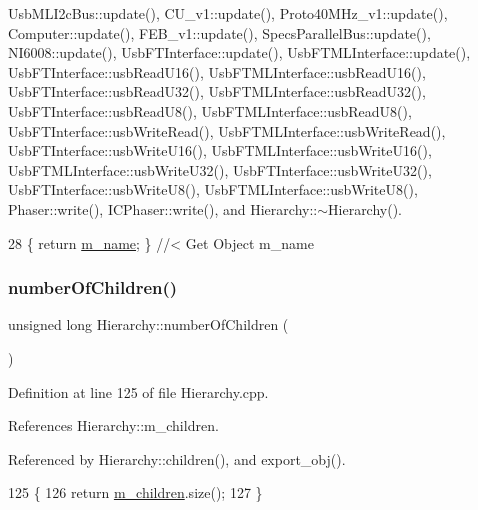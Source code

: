 Usb\+M\+L\+I2c\+Bus\+::update(), C\+U\+\_\+v1\+::update(), Proto40\+M\+Hz\+\_\+v1\+::update(), Computer\+::update(), F\+E\+B\+\_\+v1\+::update(), Specs\+Parallel\+Bus\+::update(), N\+I6008\+::update(), Usb\+F\+T\+Interface\+::update(), Usb\+F\+T\+M\+L\+Interface\+::update(), Usb\+F\+T\+Interface\+::usb\+Read\+U16(), Usb\+F\+T\+M\+L\+Interface\+::usb\+Read\+U16(), Usb\+F\+T\+Interface\+::usb\+Read\+U32(), Usb\+F\+T\+M\+L\+Interface\+::usb\+Read\+U32(), Usb\+F\+T\+Interface\+::usb\+Read\+U8(), Usb\+F\+T\+M\+L\+Interface\+::usb\+Read\+U8(), Usb\+F\+T\+Interface\+::usb\+Write\+Read(), Usb\+F\+T\+M\+L\+Interface\+::usb\+Write\+Read(), Usb\+F\+T\+Interface\+::usb\+Write\+U16(), Usb\+F\+T\+M\+L\+Interface\+::usb\+Write\+U16(), Usb\+F\+T\+M\+L\+Interface\+::usb\+Write\+U32(), Usb\+F\+T\+Interface\+::usb\+Write\+U32(), Usb\+F\+T\+Interface\+::usb\+Write\+U8(), Usb\+F\+T\+M\+L\+Interface\+::usb\+Write\+U8(), Phaser\+::write(), I\+C\+Phaser\+::write(), and Hierarchy\+::$\sim$\+Hierarchy().


\begin{DoxyCode}
28 \{ \textcolor{keywordflow}{return} \hyperlink{classObject_a8b83c95c705d2c3ba0d081fe1710f48d}{m\_name}; \} \textcolor{comment}{//< Get Object m\_name}
\end{DoxyCode}
\mbox{\label{classHierarchy_ab16e84de65fd84e14001a6cf941c8be4}} 
\subsubsection{\texorpdfstring{number\+Of\+Children()}{numberOfChildren()}}
{\footnotesize\ttfamily unsigned long Hierarchy\+::number\+Of\+Children (\begin{DoxyParamCaption}{ }\end{DoxyParamCaption})\hspace{0.3cm}{\ttfamily [inherited]}}



Definition at line 125 of file Hierarchy.\+cpp.



References Hierarchy\+::m\+\_\+children.



Referenced by Hierarchy\+::children(), and export\+\_\+obj().


\begin{DoxyCode}
125                                            \{
126   \textcolor{keywordflow}{return} \hyperlink{classHierarchy_a038816763941fd4a930504917f60483b}{m\_children}.size();
127 \}
\end{DoxyCode}
\mbox{\label{classHierarchy_aee461dc930ce3871636ff87f075b1b83}} 
